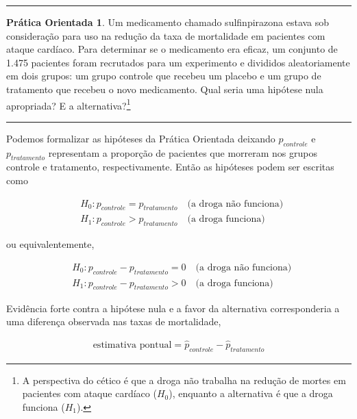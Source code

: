 \documentclass[
]{book}
\theoremstyle{definition}
\theoremstyle{definition}
\theoremstyle{definition}
\newtheorem{exercise}{Prática Orientada}[chapter]
\theoremstyle{definition}
\theoremstyle{remark}
\begin{document}
\begin{center}\rule{0.5\linewidth}{0.5pt}\end{center}

\begin{exercise}
\protect\hypertarget{exr:unnamed-chunk-184}{}{\label{exr:unnamed-chunk-184} }Um medicamento chamado sulfinpirazona estava sob consideração para uso na redução da taxa de mortalidade em pacientes com ataque cardíaco. Para determinar se o medicamento era eficaz, um conjunto de 1.475 pacientes foram recrutados para um experimento e divididos aleatoriamente em dois grupos: um grupo controle que recebeu um placebo e um grupo de tratamento que recebeu o novo medicamento. Qual seria uma hipótese nula apropriada? E a alternativa?\footnote{A perspectiva do cético é que a droga não trabalha na redução de mortes em pacientes com ataque cardíaco (\(H_0\)), enquanto a alternativa é que a droga funciona (\(H_1\)).}
\end{exercise}

\begin{center}\rule{0.5\linewidth}{0.5pt}\end{center}

Podemos formalizar as hipóteses da Prática Orientada deixando \(p_{controle}\) e \(p_{tratamento}\) representam a proporção de pacientes que morreram nos grupos controle e tratamento, respectivamente. Então as hipóteses podem ser escritas como

\begin{eqnarray*}
&&H_0: p_{controle} = p_{tratamento} \quad\text{(a droga não funciona)} \quad \\
&&H_1: p_{controle} > p_{tratamento} \quad\text{(a droga funciona)}
\end{eqnarray*}

ou equivalentemente,

\begin{eqnarray*}
&&H_0: p_{controle} - p_{tratamento} = 0 \quad\text{(a droga não funciona)} \quad \\
&&H_1: p_{controle} - p_{tratamento} > 0 \quad\text{(a droga funciona)}
\end{eqnarray*}

Evidência forte contra a hipótese nula e a favor da alternativa corresponderia a uma diferença observada nas taxas de mortalidade,

\begin{eqnarray*}
\text{estimativa pontual} = \hat{p}_{controle} - \hat{p}_{tratamento}
\end{eqnarray*}
\end{document}
